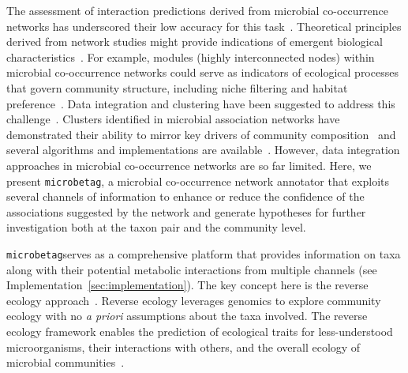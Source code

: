 \documentclass[sn-mathphys,Numbered]{sn-jnl}  %
\theoremstyle{thmstyleone}%
\theoremstyle{thmstyletwo}%
\theoremstyle{thmstylethree}%
\newcommand{\microbetag}{\texttt{microbetag}}
\begin{document}
    The assessment of interaction predictions derived from microbial co-occurrence networks has underscored their low accuracy for this task~\cite{berry2014deciphering}.
    Theoretical principles derived from network studies might provide indications of emergent biological characteristics~\cite{rottjers2018hairballs, guo2022microbial}. 
    For example, modules (highly interconnected nodes) within microbial co-occurrence networks could serve as indicators of ecological processes that govern community structure, including niche filtering and habitat preference~\cite{ma2020earth}.
    Data integration and clustering have been suggested to address this challenge~\cite{faust2021open}.
    Clusters identified in microbial association networks have demonstrated their ability to mirror key drivers of community composition~\cite{guidi2016plankton} and several algorithms and implementations are available~\cite{rottjers2020manta}.
    However, data integration approaches in microbial co-occurrence networks are so far limited.
    Here, we present \microbetag, a microbial co-occurrence network annotator that exploits several channels of information to enhance or reduce the confidence of the associations suggested by the network and generate hypotheses for further investigation both at the taxon pair and the community level.

    \microbetag serves as a comprehensive platform that provides information on taxa along with their potential metabolic interactions from multiple channels 
    (see Implementation~\ref{sec:implementation}).
    The key concept here is the reverse ecology approach~\cite{levy2012reverse}.
    Reverse ecology leverages genomics to explore community ecology with no \textit{a priori} assumptions about the taxa involved.
    The reverse ecology framework enables the prediction of ecological traits for less-understood microorganisms, their interactions with others, and the overall ecology of microbial communities~\cite{levy2014metagenomic}.
\end{document}
